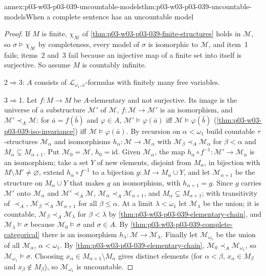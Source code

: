 \begin{annexitem}{annex:p03-w03-p03-039-uncountable-models}{thm:p03-w03-p03-039-uncountable-models}{When a complete sentence has an uncountable model}
\begin{proof}
If \(M\) is finite, \(\chi_{\mathcal M}\) of
\cref{thm:p03-w03-p03-039-finite-structures} holds in \(\mathcal M\), so
\(\sigma\models\chi_{\mathcal M}\) by completeness, every model of
\(\sigma\) is isomorphic to \(\mathcal M\), and item~1 fails; items~2
and~3 fail because an injective map of a finite set into itself is
surjective. So assume \(M\) is countably infinite.

2\(\Rightarrow\)3: \(A\) consists of \(\mathcal L_{\omega_1,\omega}\)-formulas
with finitely many free variables.

3\(\Rightarrow\)1. Let \(f:M\to M\) be \(A\)-elementary and not surjective.
Its image is the universe of a substructure \(\mathcal M'\) of \(\mathcal M\),
\(f:\mathcal M\to\mathcal M'\) is an isomorphism, and
\(\mathcal M'\prec_A\mathcal M\): for \(\bar a=f(\bar b)\) and
\(\varphi\in A\), \(\mathcal M'\models\varphi(\bar a)\) iff
\(\mathcal M\models\varphi(\bar b)\)
(\cref{thm:p03-w03-p03-039-iso-invariance}) iff
\(\mathcal M\models\varphi(\bar a)\). By recursion on \(\alpha<\omega_1\)
build countable \(\tau\)-structures \(\mathcal M_\alpha\) and isomorphisms
\(h_\alpha:\mathcal M\to\mathcal M_\alpha\) with
\(\mathcal M_\beta\prec_A\mathcal M_\alpha\) for \(\beta<\alpha\) and
\(M_\alpha\subsetneq M_{\alpha+1}\). Put \(\mathcal M_0=\mathcal M\),
\(h_0=\mathrm{id}\). Given \(\mathcal M_\alpha\), the map
\(h_\alpha\circ f^{-1}:\mathcal M'\to\mathcal M_\alpha\) is an isomorphism;
take a set \(Y\) of new elements, disjoint from \(M_\alpha\), in bijection
with \(M\setminus M'\ne\varnothing\), extend \(h_\alpha\circ f^{-1}\) to a
bijection \(g:M\to M_\alpha\cup Y\), and let \(\mathcal M_{\alpha+1}\) be the
structure on \(M_\alpha\cup Y\) that makes \(g\) an isomorphism, with
\(h_{\alpha+1}=g\). Since \(g\) carries \(\mathcal M'\) onto
\(\mathcal M_\alpha\) and \(\mathcal M'\prec_A\mathcal M\),
\(\mathcal M_\alpha\prec_A\mathcal M_{\alpha+1}\), and
\(M_\alpha\subsetneq M_{\alpha+1}\); with transitivity of \(\prec_A\),
\(\mathcal M_\beta\prec_A\mathcal M_{\alpha+1}\) for all \(\beta\le\alpha\).
At a limit \(\lambda<\omega_1\) let \(\mathcal M_\lambda\) be the union; it
is countable, \(\mathcal M_\beta\prec_A\mathcal M_\lambda\) for
\(\beta<\lambda\) by \cref{thm:p03-w03-p03-039-elementary-chain}, and
\(\mathcal M_\lambda\models\sigma\) because \(\mathcal M_0\models\sigma\) and
\(\sigma\in A\). By \cref{thm:p03-w03-p03-039-complete-categorical} there is an
isomorphism \(h_\lambda:\mathcal M\to\mathcal M_\lambda\). Finally let
\(\mathcal M_{\omega_1}\) be the union of all \(\mathcal M_\alpha\),
\(\alpha<\omega_1\). By \cref{thm:p03-w03-p03-039-elementary-chain},
\(\mathcal M_0\prec_A\mathcal M_{\omega_1}\), so
\(\mathcal M_{\omega_1}\models\sigma\). Choosing
\(x_\alpha\in M_{\alpha+1}\setminus M_\alpha\) gives distinct elements
(for \(\alpha<\beta\), \(x_\alpha\in M_\beta\) and \(x_\beta\notin M_\beta\)),
so \(\mathcal M_{\omega_1}\) is uncountable.


\end{proof}
\end{annexitem}
